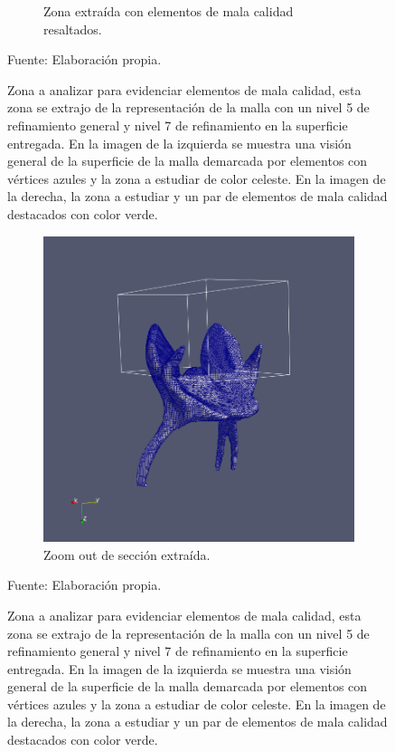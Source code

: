 \begin{figure}[!ht]
\begin{subfigure}[t]{0.45\textwidth}
        \caption{Zona extraída con elementos de mala calidad resaltados.}
    \end{subfigure}
    \caption{ Zona a analizar para evidenciar elementos de mala calidad, esta zona se extrajo de la representación de la malla con un nivel 5 de refinamiento general y nivel 7 de refinamiento en la superficie entregada. En la imagen de la izquierda se muestra una visión general de la superficie de la malla demarcada por elementos con vértices azules y la zona a estudiar de color celeste. En la imagen de la derecha, la zona a estudiar y un par de elementos de mala calidad destacados con color verde. }
    Fuente: Elaboración propia.
    \label{fig:zoom_cortex_surf}
\end{figure}


\begin{figure}[!ht]
    \centering
    \begin{subfigure}[t]{0.8\textwidth}
        \includegraphics[width=1.0\textwidth]{figures/meshes/palate_5r7_01.png}
        \caption{Zoom out de sección extraída.}
    \end{subfigure}
    \caption{ Zona a analizar para evidenciar elementos de mala calidad, esta zona se extrajo de la representación de la malla con un nivel 5 de refinamiento general y nivel 7 de refinamiento en la superficie entregada. En la imagen de la izquierda se muestra una visión general de la superficie de la malla demarcada por elementos con vértices azules y la zona a estudiar de color celeste. En la imagen de la derecha, la zona a estudiar y un par de elementos de mala calidad destacados con color verde. }
    Fuente: Elaboración propia.
    \label{fig:zoom_cortex_surf}
\end{figure}